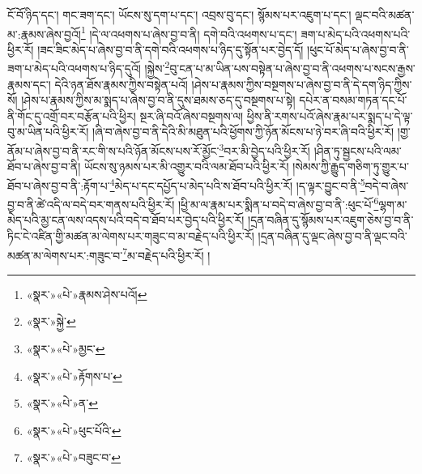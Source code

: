 ངོ་བོ་ཉིད་དང་། གང་ཟག་དང་། ཡོངས་སུ་དག་པ་དང་། འབྲས་བུ་དང་། སྙོམས་པར་འཇུག་པ་དང་། ལྡང་བའི་མཚན་མ་:རྣམས་ཞེས་བྱའོ།\footnote{«སྣར་»«པེ་»རྣམས་ཤེས་པའོ།} །དེ་ལ་འཕགས་པ་ཞེས་བྱ་བ་ནི། དགེ་བའི་འཕགས་པ་དང་། ཟག་པ་མེད་པའི་འཕགས་པའི་ཕྱིར་རོ། །ཟང་ཟིང་མེད་པ་ཞེས་བྱ་བ་ནི་དགེ་བའི་འཕགས་པ་ཉིད་དུ་སྟོན་པར་བྱེད་དོ། །ཕུང་པོ་མེད་པ་ཞེས་བྱ་བ་ནི་ཟག་པ་མེད་པའི་འཕགས་པ་ཉིད་དུའོ། །སྐྱེས་\footnote{«སྣར་»སྐྱེ་}བུ་ངན་པ་མ་ཡིན་པས་བསྟེན་པ་ཞེས་བྱ་བ་ནི་འཕགས་པ་སངས་རྒྱས་རྣམས་དང་། དེའི་ཉན་ཐོས་རྣམས་ཀྱིས་བསྟེན་པའོ། །ཤེས་པ་རྣམས་ཀྱིས་བསྔགས་པ་ཞེས་བྱ་བ་ནི་དེ་དག་ཉིད་ཀྱིས་སོ། །ཤེས་པ་རྣམས་ཀྱིས་མ་སྨད་པ་ཞེས་བྱ་བ་ནི་དུས་ཐམས་ཅད་དུ་བསྔགས་པ་སྟེ། དཔེར་ན་བསམ་གཏན་དང་པོ་ནི་གོང་དུ་འགྲོ་བར་བརྩོན་པའི་ཕྱིར། སྔར་ཞི་བའོ་ཞེས་བསྔགས་ལ། ཕྱིས་ནི་རགས་པའོ་ཞེས་རྣམ་པར་སྨད་པ་དེ་ལྟ་བུ་མ་ཡིན་པའི་ཕྱིར་རོ། །ཞི་བ་ཞེས་བྱ་བ་ནི་དེའི་མི་མཐུན་པའི་ཕྱོགས་ཀྱི་ཉོན་མོངས་པ་ཉེ་བར་ཞི་བའི་ཕྱིར་རོ། །གྱ་ནོམ་པ་ཞེས་བྱ་བ་ནི་རང་གི་ས་པའི་ཉོན་མོངས་པས་རོ་མྱོང་\footnote{«སྣར་»«པེ་»མྱང་}བར་མི་བྱེད་པའི་ཕྱིར་རོ། །ཤིན་ཏུ་སྦྱངས་པའི་ལམ་ཐོབ་པ་ཞེས་བྱ་བ་ནི། ཡོངས་སུ་ཉམས་པར་མི་འགྱུར་བའི་ལམ་ཐོབ་པའི་ཕྱིར་རོ། །སེམས་ཀྱི་རྒྱུད་གཅིག་ཏུ་གྱུར་པ་ཐོབ་པ་ཞེས་བྱ་བ་ནི་:རྟོག་པ་\footnote{«སྣར་»«པེ་»རྟོགས་པ་}མེད་པ་དང་དཔྱོད་པ་མེད་པའི་ས་ཐོབ་པའི་ཕྱིར་རོ། །ད་ལྟར་བྱུང་བ་ནི་\footnote{«སྣར་»«པེ་»ན་}བདེ་བ་ཞེས་བྱ་བ་ནི་ཚེ་འདི་ལ་བདེ་བར་གནས་པའི་ཕྱིར་རོ། །ཕྱི་མ་ལ་རྣམ་པར་སྨིན་པ་བདེ་བ་ཞེས་བྱ་བ་ནི་:ཕུང་པོ་\footnote{«སྣར་»«པེ་»ཕུང་པོའི་}ལྷག་མ་མེད་པའི་མྱ་ངན་ལས་འདས་པའི་བདེ་བ་ཐོབ་པར་བྱེད་པའི་ཕྱིར་རོ། །དྲན་བཞིན་དུ་སྙོམས་པར་འཇུག་ཅེས་བྱ་བ་ནི་ཏིང་ངེ་འཛིན་གྱི་མཚན་མ་ལེགས་པར་གཟུང་བ་མ་བརྗེད་པའི་ཕྱིར་རོ། །དྲན་བཞིན་དུ་ལྡང་ཞེས་བྱ་བ་ནི་ལྡང་བའི་མཚན་མ་ལེགས་པར་:གཟུང་བ་\footnote{«སྣར་»«པེ་»བཟུང་བ་}མ་བརྗེད་པའི་ཕྱིར་རོ། །
